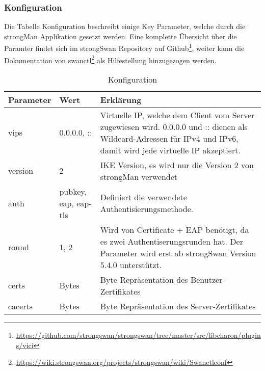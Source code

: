 \subsubsection{Konfiguration}
Die Tabelle Konfiguration beschreibt einige Key Parameter, welche durch die strongMan Applikation gesetzt werden. Eine komplette Übersicht über die Paramter findet sich im strongSwan Repository auf Github\footnote{\url{https://github.com/strongswan/strongswan/tree/master/src/libcharon/plugins/vici}}, weiter kann die Dokumentation von swanctl\footnote{\url{https://wiki.strongswan.org/projects/strongswan/wiki/Swanctlconf}} als Hilfestellung hinzugezogen werden.\\
\begin{table}[H]
\centering
    \begin{tabular}{|p{}|p{}|p{}|}
    \hline
    \rowcolor{lightblue}
    Parameter & Wert & Erklärung \\ \hline
	vips	&	0.0.0.0,  :: & Virtuelle IP, welche dem Client vom Server zugewiesen wird. 0.0.0.0 und :: dienen als Wildcard-Adressen für IPv4 und IPv6, damit wird jede virtuelle IP akzeptiert.	\\ \hline
	version & 2 & IKE Version, es wird nur die Version 2 von strongMan verwendet \\ \hline
	auth & pubkey, eap, eap-tls & Definiert die verwendete Authentisierungsmethode. \\ \hline
	round & 1, 2 & Wird von Certificate + EAP benötigt, da es zwei Authentiserungsrunden hat. Der Parameter wird erst ab strongSwan Version 5.4.0 unterstützt. \\ \hline
	certs & Bytes & Byte Repräsentation des Benutzer-Zertifikates	\\ \hline
	cacerts & Bytes & Byte Repräsentation des Server-Zertifikates	\\ \hline
	\end{tabular}
    \caption[Konfiguration]{Konfiguration}
\end{table}
\newpage

